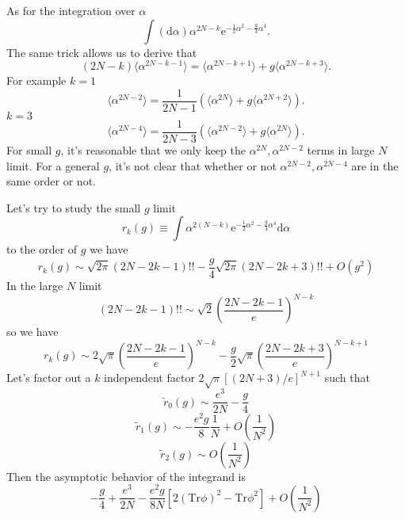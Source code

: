 As for the integration over $\alpha$
\[
	\int (\mathrm{d}\alpha) \alpha^{2N - k} \mathrm{e}^{- \frac{1}{2} \alpha^2 - \frac{g}{4} \alpha^4}
.\] 
The same trick allows us to derive that
\[
	(2N-k) \langle \alpha^{2N-k-1}\rangle = \langle \alpha^{2N-k + 1} \rangle + g \langle \alpha^{2N-k+3} \rangle
.\] 
For example $k=1$
\[
	\langle \alpha^{2N-2} \rangle = \frac{1}{2N-1} (\langle \alpha^{2N} \rangle + g \langle \alpha^{2N+2}\rangle)
.\] 
$k=3$
\[
	\langle \alpha^{2N-4} \rangle = \frac{1}{2N-3}(\langle \alpha^{2N-2} \rangle + g \langle \alpha^{2N} \rangle)
.\] 
For small $g$, it's reasonable that we only keep the $\alpha^{2N},\alpha^{2N-2}$ terms in large $N$ limit.
For a general $g$, it's not clear that whether or not $\alpha^{2N-2},\alpha^{2N-4}$ are in the same order or not.

Let's try to study the small $g$ limit
\begin{equation}
    r_k (g) \equiv \int \alpha^{2(N-k)}\mathrm{e}^{-\frac{1}{2}\alpha^2 - \frac{g}{4}\alpha^4}\mathrm{d}\alpha
\end{equation}
to the order of $g$ we have
\[r_k(g) \sim \sqrt{2\pi}(2N-2k-1)!! - \frac{g}{4}\sqrt{2\pi}(2N-2k+3)!! + O(g^2)\]
In the large $N$ limit
\[(2N-2k-1)!!\sim \sqrt{2}\left(\frac{2N-2k-1}{e}\right)^{N-k}\]
so we have
\[r_k(g) \sim 2\sqrt{\pi}\left(\frac{2N-2k-1}{e}\right)^{N-k} - \frac{g}{2}\sqrt{\pi}\left(\frac{2N-2k+3}{e}\right)^{N-k+1}\]
Let's factor out a $k$ independent factor $2\sqrt{\pi}[(2N+3)/e]^{N+1}$ such that
\[\tilde{r}_0(g) \sim \frac{e^3}{2N} - \frac{g}{4}\]
\[ \tilde{r}_1(g) \sim -\frac{e^2 g}{8}\frac{1}{N} + O(\frac{1}{N^2})\]
\[\tilde{r}_2 (g) \sim O(\frac{1}{N^2})\]
Then the asymptotic behavior of the integrand is
\[-\frac{g}{4} + \frac{e^3}{2N} -\frac{e^2g}{8N}\left[2(\mathrm{Tr}\phi)^2 - \mathrm{Tr}\phi^2\right] + O(\frac{1}{N^2})\]


